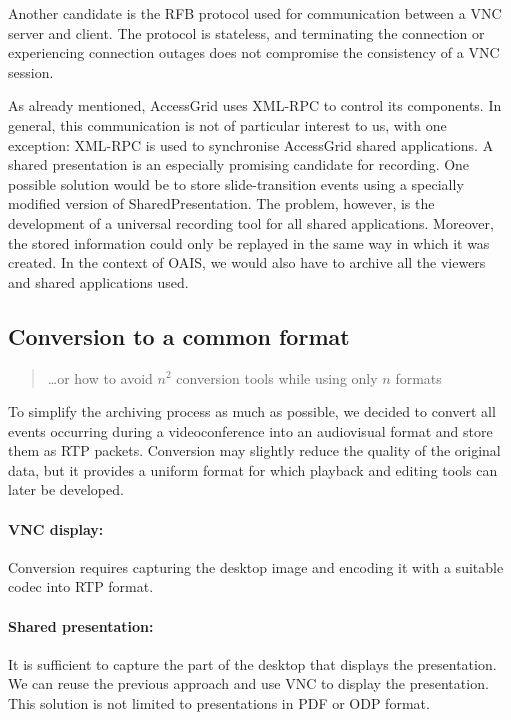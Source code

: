 Another candidate is the RFB protocol used for communication between a VNC server and client. The protocol is stateless, and terminating the connection or experiencing connection outages does not compromise the consistency of a VNC session.

As already mentioned, AccessGrid uses XML-RPC to control its components. In general, this communication is not of particular interest to us, with one exception: XML-RPC is used to synchronise AccessGrid shared applications. A shared presentation is an especially promising candidate for recording. One possible solution would be to store slide-transition events using a specially modified version of SharedPresentation. The problem, however, is the development of a universal recording tool for all shared applications. Moreover, the stored information could only be replayed in the same way in which it was created. In the context of OAIS, we would also have to archive all the viewers and shared applications used.

\subsection{Conversion to a common format}

\begin{quote}
\ldots or how to avoid $n^2$ conversion tools while using only $n$ formats
\end{quote}

To simplify the archiving process as much as possible, we decided to convert all events occurring during a videoconference into an audiovisual format and store them as RTP packets. Conversion may slightly reduce the quality of the original data, but it provides a uniform format for which playback and editing tools can later be developed.

\paragraph*{VNC display:} Conversion requires capturing the desktop image and encoding it with a suitable codec into RTP format.

\paragraph*{Shared presentation:} It is sufficient to capture the part of the desktop that displays the presentation. We can reuse the previous approach and use VNC to display the presentation. This solution is not limited to presentations in PDF or ODP format.

